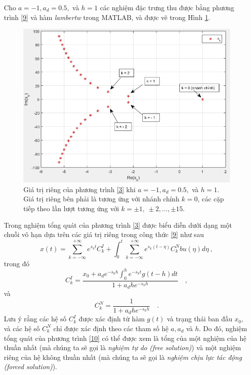 \begin{vd}\label{vidu1}
	Cho $a=-1, a_d=0.5,$ và $h=1$ các nghiệm đặc trưng thu được bằng phương trình \eqref{9} và hàm \emph{lambertw} trong MATLAB, và được vẽ trong Hình \ref{refhinh1}.
	\begin{figure}[h]
		\centering
		\includegraphics[width=0.9\linewidth]{hinh/hinh1}
		\caption{Giá trị riêng của phương trình \eqref{3} khi $a=-1, a_d=0.5,$ và $h=1$. Giá trị riêng bên phải là tương ứng với nhánh chính $k=0$, các cặp tiếp theo lần lượt tương ứng với $k=\pm 1, \ \pm 2, \dots, \pm 15$.}
		\label{refhinh1}
	\end{figure}
\end{vd}

Trong \cite{YiEig10} nghiệm tổng quát của phương trình \eqref{3} được biểu diễn dưới dạng một chuỗi vô hạn dựa trên các giá trị riêng trong công thức \eqref{9} như sau
\begin{equation}\label{10}
x(t)=\sum\limits^{+\infty}_{k=-\infty}e^{s_kt}C^I_k+\int^t_0\sum\limits^{+\infty}_{k=-\infty}e^{s_k(t-\eta)}C^N_kbu(\eta)d\eta \ ,
\end{equation} 
trong đó
\begin{equation}\label{11}
C^I_k=\dfrac{x_0+a_de^{-s_kh}\int^h_0e^{-s_kt}g(t-h)dt}{1+a_dhe^{-s_kh}} \quad ,
\end{equation} 
và
\begin{equation}\label{12}
C^N_k=\dfrac{1}{1+a_dhe^{-s_kh}} \quad .
\end{equation} 
Lưu ý rằng các hệ số $C^I_k$ được xác định từ hàm $g(t)$ và trạng thái ban đầu $x_0$, và các hệ số $C^N_k$ chỉ được xác định theo các tham số hệ $a, a_d$ và $h$. Do đó, nghiệm tổng quát của phương trình \eqref{10} có thể được xem là tổng của một nghiệm của hệ thuần nhất (mà chúng ta sẽ gọi là \emph{nghiệm tự do (free solution)}) và một nghiệm riêng của hệ không thuần nhất (mà chúng ta sẽ gọi là \emph{nghiệm chịu lực tác động (forced solution)}). 


